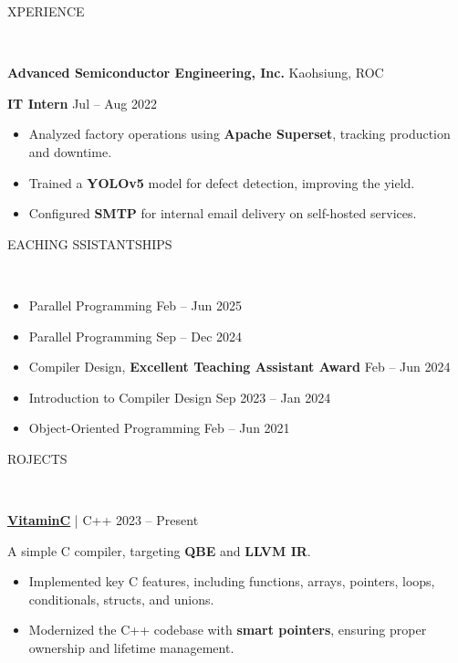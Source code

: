 \documentclass[11pt]{article}
\begin{document}
\begin{center}
    \scalebox{1.3}{E}XPERIENCE\raggedright \,\hrulefill
\end{center}

\textbf{Advanced Semiconductor Engineering, Inc.}   \hfill Kaohsiung, ROC

\textbf{IT Intern} \hfill Jul -- Aug 2022
\begin{itemize}[noitemsep, topsep=0pt, partopsep=0pt, parsep=0pt, leftmargin=*]
    \item Analyzed factory operations using \textbf{Apache Superset}, tracking production and downtime.
    \item Trained a \textbf{YOLOv5} model for defect detection, improving the yield.
    \item Configured \textbf{SMTP} for internal email delivery on self-hosted services.
\end{itemize}

\begin{center}
    \scalebox{1.3}{T}EACHING \scalebox{1.3}{A}SSISTANTSHIPS\raggedright \,\hrulefill
\end{center}

\begin{itemize}[noitemsep, topsep=0pt, partopsep=0pt, parsep=0pt, leftmargin=*]
    \item {}  Parallel Programming \hfill Feb -- Jun 2025
    \item {}  Parallel Programming \hfill Sep -- Dec 2024
    \item {}  Compiler Design, \textbf{Excellent Teaching Assistant Award} \hfill Feb -- Jun 2024
    \item {}  Introduction to Compiler Design \hfill Sep 2023 -- Jan 2024
    \item {}    Object-Oriented Programming \hfill Feb -- Jun 2021
\end{itemize}

\begin{center}
    \scalebox{1.3}{P}ROJECTS\raggedright \,\hrulefill
\end{center}

\textbf{\href{https://github.com/fruits-lab/vitaminc}{VitaminC}} | C++ \hfill 2023 -- Present

A simple C compiler, targeting \textbf{QBE} and \textbf{LLVM IR}.
\begin{itemize}[noitemsep, topsep=0pt, partopsep=0pt, parsep=0pt, leftmargin=*]
    \item Implemented key C features, including functions, arrays, pointers, loops, conditionals, structs, and unions.
    \item Modernized the C++ codebase with \textbf{smart pointers}, ensuring proper ownership and lifetime management.
\end{itemize}
\end{document}
